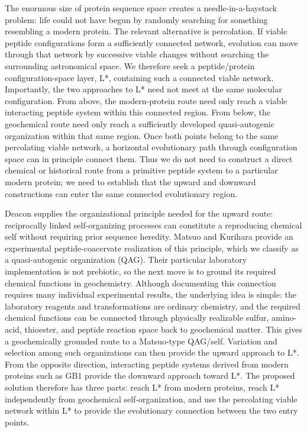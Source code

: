 \documentclass[11pt]{article}
\begin{document}
The enormous size of protein sequence space creates a needle-in-a-haystack problem: life could not have begun by randomly searching for something resembling a modern protein. The relevant alternative is percolation. If viable peptide configurations form a sufficiently connected network, evolution can move through that network by successive viable changes without searching the surrounding astronomical space. We therefore seek a peptide/protein configuration-space layer, L*, containing such a connected viable network. Importantly, the two approaches to L* need not meet at the same molecular configuration. From above, the modern-protein route need only reach a viable interacting peptide system within this connected region. From below, the geochemical route need only reach a sufficiently developed quasi-autogenic organization within that same region. Once both points belong to the same percolating viable network, a horizontal evolutionary path through configuration space can in principle connect them. Thus we do not need to construct a direct chemical or historical route from a primitive peptide system to a particular modern protein; we need to establish that the upward and downward constructions can enter the same connected evolutionary region.

Deacon supplies the organizational principle needed for the upward route: reciprocally linked self-organizing processes can constitute a reproducing chemical self without requiring prior sequence heredity. Matsuo and Kurihara provide an experimental peptide-coacervate realization of this principle, which we classify as a quasi-autogenic organization (QAG). Their particular laboratory implementation is not prebiotic, so the next move is to ground its required chemical functions in geochemistry. Although documenting this connection requires many individual experimental results, the underlying idea is simple: the laboratory reagents and transformations are ordinary chemistry, and the required chemical functions can be connected through physically realizable sulfur, amino-acid, thioester, and peptide reaction space back to geochemical matter. This gives a geochemically grounded route to a Matsuo-type QAG/self. Variation and selection among such organizations can then provide the upward approach to L*. From the opposite direction, interacting peptide systems derived from modern proteins such as GB1 provide the downward approach toward L*. The proposed solution therefore has three parts: reach L* from modern proteins, reach L* independently from geochemical self-organization, and use the percolating viable network within L* to provide the evolutionary connection between the two entry points.
\end{document}
